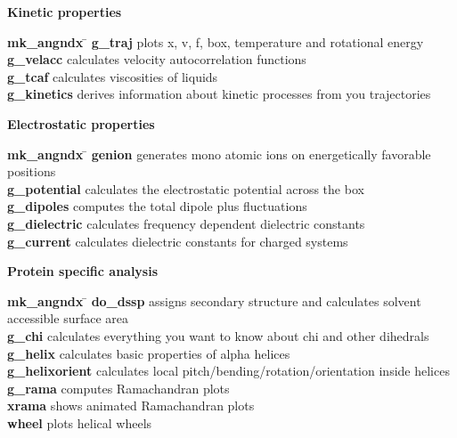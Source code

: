 \begin{description}
\item {\large\bf Kinetic properties}
\vspace{-2ex}\begin{tabbing}
{\bf mk\_angndx} \= \kill
{\bf g\_traj} \> plots x, v, f, box, temperature and rotational energy \\
{\bf g\_velacc} \> calculates velocity autocorrelation functions \\
{\bf g\_tcaf} \> calculates viscosities of liquids \\
{\bf g\_kinetics} \> derives information about kinetic processes from you trajectories \\
\end{tabbing}\vspace{-2ex}

\item {\large\bf Electrostatic properties}
\vspace{-2ex}\begin{tabbing}
{\bf mk\_angndx} \= \kill
{\bf genion} \> generates mono atomic ions on energetically favorable positions \\
{\bf g\_potential} \> calculates the electrostatic potential across the box \\
{\bf g\_dipoles} \> computes the total dipole plus fluctuations \\
{\bf g\_dielectric} \> calculates frequency dependent dielectric constants \\
{\bf g\_current} \> calculates dielectric constants for charged systems \\
\end{tabbing}\vspace{-2ex}

\item {\large\bf Protein specific analysis}
\vspace{-2ex}\begin{tabbing}
{\bf mk\_angndx} \= \kill
{\bf do\_dssp} \> assigns secondary structure and calculates solvent accessible surface area \\
{\bf g\_chi} \> calculates everything you want to know about chi and other dihedrals \\
{\bf g\_helix} \> calculates basic properties of alpha helices \\
{\bf g\_helixorient} \> calculates local pitch/bending/rotation/orientation inside helices \\
{\bf g\_rama} \> computes Ramachandran plots \\
{\bf xrama} \> shows animated Ramachandran plots \\
{\bf wheel} \> plots helical wheels \\
\end{tabbing}\vspace{-2ex}


\end{description}
